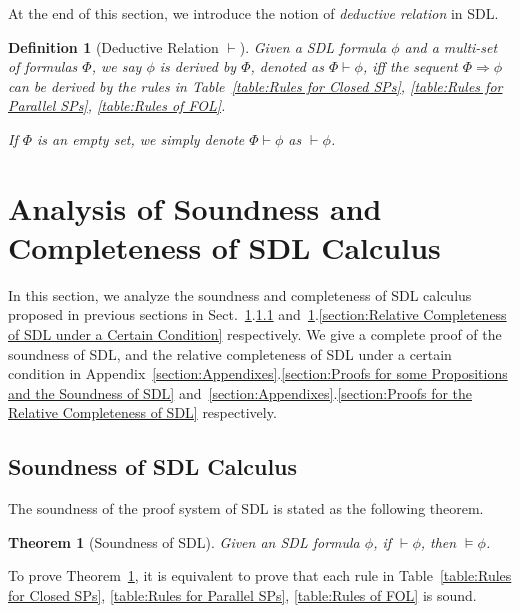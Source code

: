 \documentclass{fcs}
\newtheorem{mydef}{Definition}[section]
\newtheorem{mytheo}{Theorem}[section]
\newcommand{\seqArrow}[0]{\Rightarrow}
\begin{document}
At the end of this section, we introduce the notion of \emph{deductive relation} in SDL.
\begin{mydef}[Deductive Relation $\vdash$]
    Given a SDL formula $\phi$ and a multi-set of formulas $\Phi$,
    we say $\phi$ is derived by $\Phi$, denoted as $\Phi\vdash \phi$, iff the sequent $\Phi\seqArrow \phi$ can be derived by the rules in Table~\ref{table:Rules for Closed SPs}, \ref{table:Rules for Parallel SPs}, \ref{table:Rules of FOL}.

    If $\Phi$ is an empty set, we simply denote $\Phi\vdash \phi$ as $\vdash \phi$.
\end{mydef}




\section{Analysis of Soundness and Completeness of SDL Calculus}
\label{section:Soundness and Relative Completeness of SDL Calculus}
In this section, we analyze the soundness and completeness of SDL calculus proposed in previous sections in Sect.~\ref{section:Soundness and Relative Completeness of SDL Calculus}.\ref{section:Soundness of SDL Calculus} and~\ref{section:Soundness and Relative Completeness of SDL Calculus}.\ref{section:Relative Completeness of SDL under a Certain Condition} respectively.
We give a complete proof of the soundness of SDL, and the relative completeness of SDL under a certain condition in Appendix~\ref{section:Appendixes}.\ref{section:Proofs for some Propositions and the Soundness of SDL} and~\ref{section:Appendixes}.\ref{section:Proofs for the Relative Completeness of SDL}
respectively.


\subsection{Soundness of SDL Calculus}
\label{section:Soundness of SDL Calculus}
The soundness of the proof system of SDL is stated as the following theorem.

\begin{mytheo}[Soundness of SDL]
\label{theorem:Soundness of SDL}
Given an SDL formula $\phi$, if $\vdash \phi$, then $\models \phi$.
\end{mytheo}

To prove Theorem~\ref{theorem:Soundness of SDL}, it is equivalent to prove that each rule in Table~\ref{table:Rules for Closed SPs}, \ref{table:Rules for Parallel SPs}, \ref{table:Rules of FOL} is sound.
\end{document}
